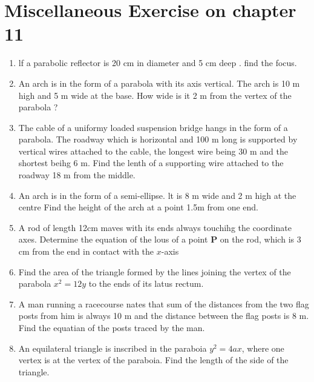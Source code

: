 \documentclass[12pt]{article}
\let\vec\mathbf
\begin{document}
\section*{Miscellaneous Exercise on chapter 11}
\begin{enumerate}		
\item lf a parabolic reflector is 20 cm in diameter and 5 cm deep . find the focus.
\item An arch is in the form of a parabola with its axis vertical. The arch is 10 m high and 5 m wide at the base. How wide is it  2 m from the vertex of the parabola ?
\item The cable of a uniformy loaded suspension bridge hangs in the form of a parabola. The roadway which is  horizontal and 100 m long is supported by vertical wires attached to the cable, the longest wire being 30 m and the shortest beihg 6 m. Find the lenth of a supporting wire attached to the  roadway 18 m from the middle.
\item An arch is in the form of a semi-ellipse. lt is 8 m wide and 2 m high at the centre Find the height of the arch at a point 1.5m from one end.
\item A rod of length 12cm maves with its ends always touchihg the coordinate axes. Determine the equation of the lous of a point $\vec{P}$ on the rod, which is 3 cm from the end in contact with the $x$-axis
\item Find the area of the triangle formed by the lines joining the vertex of the parabola $x^2=12y$ to the ends of its latus rectum.
\item A man running a racecourse nates that sum of the distances from the two flag posts from him is always 10 m  and the distance between the flag posts is 8 m. Find the equatian of the posts traced by the man.
\item An equilateral triangle is inscribed in the paraboia $y^2=4ax$, where one vertex is at the vertex of the paraboia. Find the length of the side of the triangle.
\end{enumerate}
\end{document}

